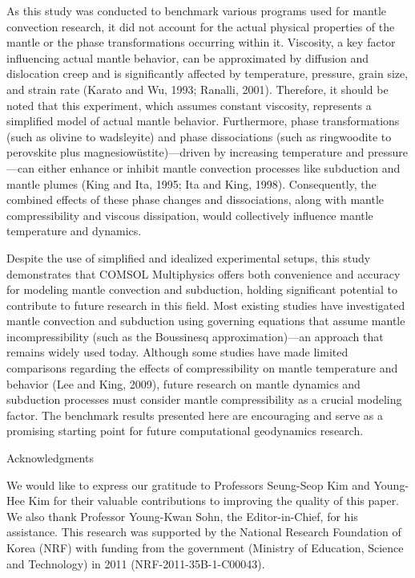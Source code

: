 As this study was conducted to benchmark various programs used for mantle convection research, it did not account for the actual physical properties of the mantle or the phase transformations occurring within it. Viscosity, a key factor influencing actual mantle behavior, can be approximated by diffusion and dislocation creep and is significantly affected by temperature, pressure, grain size, and strain rate (Karato and Wu, 1993; Ranalli, 2001). Therefore, it should be noted that this experiment, which assumes constant viscosity, represents a simplified model of actual mantle behavior. Furthermore, phase transformations (such as olivine to wadsleyite) and phase dissociations (such as ringwoodite to perovskite plus magnesiowüstite)—driven by increasing temperature and pressure—can either enhance or inhibit mantle convection processes like subduction and mantle plumes (King and Ita, 1995; Ita and King, 1998). Consequently, the combined effects of these phase changes and dissociations, along with mantle compressibility and viscous dissipation, would collectively influence mantle temperature and dynamics.

Despite the use of simplified and idealized experimental setups, this study demonstrates that COMSOL Multiphysics offers both convenience and accuracy for modeling mantle convection and subduction, holding significant potential to contribute to future research in this field. Most existing studies have investigated mantle convection and subduction using governing equations that assume mantle incompressibility (such as the Boussinesq approximation)—an approach that remains widely used today. Although some studies have made limited comparisons regarding the effects of compressibility on mantle temperature and behavior (Lee and King, 2009), future research on mantle dynamics and subduction processes must consider mantle compressibility as a crucial modeling factor. The benchmark results presented here are encouraging and serve as a promising starting point for future computational geodynamics research.

Acknowledgments

We would like to express our gratitude to Professors Seung-Seop Kim and Young-Hee Kim for their valuable contributions to improving the quality of this paper. We also thank Professor Young-Kwan Sohn, the Editor-in-Chief, for his assistance. This research was supported by the National Research Foundation of Korea (NRF) with funding from the government (Ministry of Education, Science and Technology) in 2011 (NRF-2011-35B-1-C00043).


